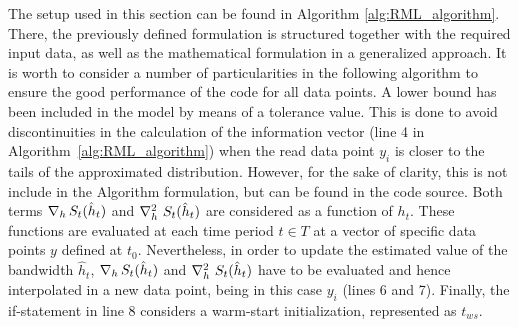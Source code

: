 The setup used in this section can be found in Algorithm \ref{alg:RML_algorithm}. There, the previously defined formulation is structured together with the required input data, as well as the mathematical formulation in a generalized approach. It is worth to consider a number of particularities in the following algorithm to ensure the good performance of the code for all data points. A lower bound has been included in the model by means of a tolerance value.  This is done to avoid discontinuities in the calculation of the information vector (line 4 in Algorithm~\ref{alg:RML_algorithm}) when the read data point $y_{i}$ is closer to the tails of the approximated distribution. However, for the sake of clarity, this is not include in the Algorithm formulation, but can be found in the code source. Both terms $\nabla_h \, \mathlarger{S}_t (\hat{h}_{t})$ and $\nabla^2_h \ \mathlarger{S}_t (\hat{h}_{t})$ are considered as a function of $h_{t}$. These functions are evaluated at each time period $t \in T$ at a vector of specific data points $y$ defined at $t_0$. Nevertheless, in order to update the estimated value of the bandwidth $\hat{h}_t$, $\nabla_h \, \mathlarger{S}_t (\hat{h}_{t})$ and $\nabla^2_h \ \mathlarger{S}_t (\hat{h}_{t})$ have to be evaluated and hence interpolated in a new data point, being in this case $y_i$ (lines 6 and 7). Finally, the if-statement in line 8 considers a warm-start initialization, represented as $t_{ws}$.

